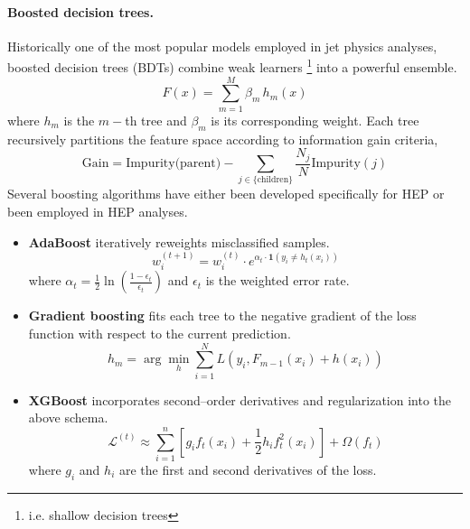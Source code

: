         \paragraph{Boosted decision trees.}
            Historically one of the most popular models employed in jet physics analyses, boosted decision trees (BDTs) combine weak learners \footnote{i.e. shallow decision trees} into a powerful ensemble.
            \begin{equation}
                F(x) = \sum_{m=1}^M \beta_m \,h_m(x)
            \end{equation}
            where \(h_m\) is the \(m-\)th tree and \(\beta_m\) is its corresponding weight.
            Each tree recursively partitions the feature space according to information gain criteria,
            \begin{equation}
                \text{Gain} = \text{Impurity(parent)} - \sum_{j \in \{\text{children}\}} \frac{N_j}{N} \text{Impurity}(j)
            \end{equation}
            Several boosting algorithms have either been developed specifically for HEP or been employed in HEP analyses.
            \begin{itemize}
                \item \textbf{AdaBoost} iteratively reweights misclassified samples.
                \begin{equation}
                    w_i^{(t+1)} = w_i^{(t)} \cdot e^{\alpha_t \cdot \mathbf{1}(y_i \neq h_t(x_i))}
                \end{equation}
                where \(\alpha_t = \frac{1}{2}\ln\left(\frac{1-\epsilon_t}{\epsilon_t}\right)\) and \(\epsilon_t\) is the weighted error rate.
                \item \textbf{Gradient boosting} fits each tree to the negative gradient of the loss function with respect to the current prediction.
                \begin{equation}
                    h_m = \arg\min_h \sum_{i=1}^N L(y_i, F_{m-1}(x_i) + h(x_i))
                \end{equation}
                \item \textbf{XGBoost} incorporates second--order derivatives and regularization into the above schema.
                \begin{equation}
                    \mathcal{L}^{(t)} \approx \sum_{i=1}^n [g_i f_t(x_i) + \frac{1}{2} h_i f_t^2(x_i)] + \Omega(f_t)
                \end{equation}
            where \(g_i\) and \(h_i\) are the first and second derivatives of the loss.
            \end{itemize}
            
